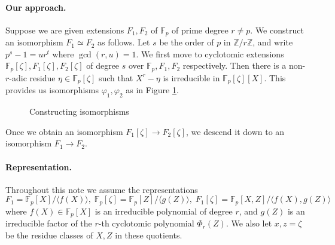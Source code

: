 \documentclass[12pt]{article}
\theoremstyle{plain}
\theoremstyle{definition}
\def\F{\mathbb{F}}
\begin{document}
\paragraph{Our approach.} Suppose we are given extensions $F_1, F_2$ of $\F_p$ of prime degree $r \ne p$. We construct an
isomorphism $F_1 \simeq F_2$ as follows. Let $s$ be the order of $p$ in $\mathbb{Z} / r\mathbb{Z}$, and write $p^s - 1 = ur^t$
where $\gcd(r, u) = 1$. We first move to cyclotomic extensions $\F_p[\zeta], F_1[\zeta], F_2[\zeta]$ of degree $s$ over $\F_p,
F_1, F_2$ respectively. Then there is a non-$r$-adic residue $\eta \in \F_p[\zeta]$ such that $X^r - \eta$ is irreducible in
$\F_p[\zeta][X]$. This provides us isomorphisms $\varphi_1, \varphi_2$ as in Figure \ref{figure:our-approach}.
\begin{figure}
\label{figure:our-approach}
	\begin{center}
		\caption{Constructing isomorphisms}
	\end{center}
\end{figure}
Once we obtain an isomorphism $F_1[\zeta] \rightarrow F_2[\zeta]$, we descend it down to an isomorphism $F_1 \rightarrow F_2$.

\paragraph{Representation.} Throughout this note we assume the representations
\begin{equation}
\label{equation:rep}
	F_1 = \F_p[X] / \langle f(X) \rangle, \; \F_p[\zeta] = \F_p[Z] / \langle g(Z) \rangle, \;
	F_1[\zeta] = \F_p[X, Z] / \langle f(X), g(Z) \rangle
\end{equation}
where $f(X) \in \F_p[X]$ is an irreducible polynomial of degree $r$, and $g(Z)$ is an irreducible factor of the $r$-th cyclotomic
polynomial $\Phi_r(Z)$. We also let $x, z = \zeta$ be the residue classes of $X, Z$ in these quotients.
\end{document}
